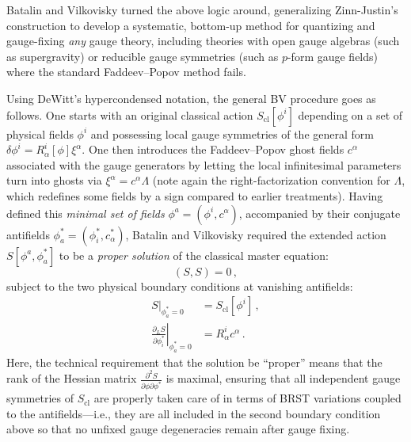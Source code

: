 Batalin and Vilkovisky turned the above logic around, generalizing Zinn-Justin's construction to develop a systematic, bottom-up method for quantizing and gauge-fixing \textit{any} gauge theory, including theories with open gauge algebras (such as supergravity) or reducible gauge symmetries (such as \(p\)-form gauge fields) where the standard Faddeev--Popov method fails.

Using DeWitt's hypercondensed notation, the general BV procedure goes as follows. One starts with an original classical action \(S_{\text{cl}}[\phi^i]\) depending on a set of physical fields \(\phi^i\) and possessing local gauge symmetries of the general form \(\delta \phi^i = R^i_\alpha[\phi] \xi^\alpha\). One then introduces the Faddeev--Popov ghost fields \(c^\alpha\) associated with the gauge generators by letting the local infinitesimal parameters turn into ghosts via \(\xi^\alpha = c^\alpha \Lambda\) (note again the right-factorization convention for \(\Lambda\), which redefines some fields by a sign compared to earlier treatments). Having defined this \textit{minimal set of fields} \(\phi^a = (\phi^i, c^\alpha)\), accompanied by their conjugate antifields \(\phi_a^* = (\phi_i^*, c_\alpha^*)\), Batalin and Vilkovisky required the extended action \(S[\phi^a, \phi_a^*]\) to be a \textit{proper solution} of the classical master equation:
\begin{equation} \label{eq:bv_master_eq_minimal}
    (S, S) = 0 \, ,
\end{equation}
subject to the two physical boundary conditions at vanishing antifields:
\begin{equation} \label{eq:bv_boundary_conditions}
    \begin{aligned}
        \left. S \right|_{\phi_a^* = 0}                                      & = S_{\text{cl}}[\phi^i] \, , \\
        \left. \frac{\partial_L S}{\partial \phi_i^*} \right|_{\phi_a^* = 0} & = R^i_\alpha c^\alpha \, .
    \end{aligned}
\end{equation}
Here, the technical requirement that the solution be ``proper'' means that the rank of the Hessian matrix \(\frac{\partial^2 S}{\partial \phi \partial \phi^*}\) is maximal, ensuring that all independent gauge symmetries of \(S_{\text{cl}}\) are properly taken care of in terms of BRST variations coupled to the antifields—i.e., they are all included in the second boundary condition above so that no unfixed gauge degeneracies remain after gauge fixing.

